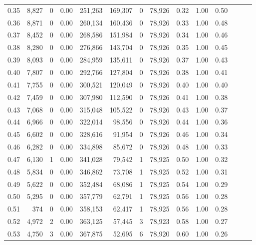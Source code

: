 \begin{tabular}{rrrrrrrrrrrrrr}
0.35 &  8,827 &      0 &  0.00 &  251,263 &  169,307 &       0 &  78,926 &  0.32 &  1.00 &      0.50 \\
0.36 &  8,871 &      0 &  0.00 &  260,134 &  160,436 &       0 &  78,926 &  0.33 &  1.00 &      0.48 \\
0.37 &  8,452 &      0 &  0.00 &  268,586 &  151,984 &       0 &  78,926 &  0.34 &  1.00 &      0.46 \\
0.38 &  8,280 &      0 &  0.00 &  276,866 &  143,704 &       0 &  78,926 &  0.35 &  1.00 &      0.45 \\
0.39 &  8,093 &      0 &  0.00 &  284,959 &  135,611 &       0 &  78,926 &  0.37 &  1.00 &      0.43 \\
0.40 &  7,807 &      0 &  0.00 &  292,766 &  127,804 &       0 &  78,926 &  0.38 &  1.00 &      0.41 \\
0.41 &  7,755 &      0 &  0.00 &  300,521 &  120,049 &       0 &  78,926 &  0.40 &  1.00 &      0.40 \\
0.42 &  7,459 &      0 &  0.00 &  307,980 &  112,590 &       0 &  78,926 &  0.41 &  1.00 &      0.38 \\
0.43 &  7,068 &      0 &  0.00 &  315,048 &  105,522 &       0 &  78,926 &  0.43 &  1.00 &      0.37 \\
0.44 &  6,966 &      0 &  0.00 &  322,014 &   98,556 &       0 &  78,926 &  0.44 &  1.00 &      0.36 \\
0.45 &  6,602 &      0 &  0.00 &  328,616 &   91,954 &       0 &  78,926 &  0.46 &  1.00 &      0.34 \\
0.46 &  6,282 &      0 &  0.00 &  334,898 &   85,672 &       0 &  78,926 &  0.48 &  1.00 &      0.33 \\
0.47 &  6,130 &      1 &  0.00 &  341,028 &   79,542 &       1 &  78,925 &  0.50 &  1.00 &      0.32 \\
0.48 &  5,834 &      0 &  0.00 &  346,862 &   73,708 &       1 &  78,925 &  0.52 &  1.00 &      0.31 \\
0.49 &  5,622 &      0 &  0.00 &  352,484 &   68,086 &       1 &  78,925 &  0.54 &  1.00 &      0.29 \\
0.50 &  5,295 &      0 &  0.00 &  357,779 &   62,791 &       1 &  78,925 &  0.56 &  1.00 &      0.28 \\
0.51 &    374 &      0 &  0.00 &  358,153 &   62,417 &       1 &  78,925 &  0.56 &  1.00 &      0.28 \\
0.52 &  4,972 &      2 &  0.00 &  363,125 &   57,445 &       3 &  78,923 &  0.58 &  1.00 &      0.27 \\
0.53 &  4,750 &      3 &  0.00 &  367,875 &   52,695 &       6 &  78,920 &  0.60 &  1.00 &      0.26 \\

\end{tabular}
